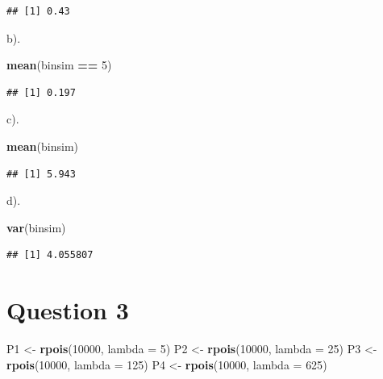 \documentclass[
]{article}
\newenvironment{Shaded}{\begin{snugshade}}{\end{snugshade}}
\newcommand{\AttributeTok}[1]{\textcolor[rgb]{0.13,0.29,0.53}{#1}}
\newcommand{\DecValTok}[1]{\textcolor[rgb]{0.00,0.00,0.81}{#1}}
\newcommand{\FunctionTok}[1]{\textcolor[rgb]{0.13,0.29,0.53}{\textbf{#1}}}
\newcommand{\NormalTok}[1]{#1}
\newcommand{\OtherTok}[1]{\textcolor[rgb]{0.56,0.35,0.01}{#1}}
\newcommand{\SpecialCharTok}[1]{\textcolor[rgb]{0.81,0.36,0.00}{\textbf{#1}}}
\begin{document}
\begin{verbatim}
## [1] 0.43
\end{verbatim}

b).

\begin{Shaded}
\begin{Highlighting}[]
\FunctionTok{mean}\NormalTok{(binsim }\SpecialCharTok{==} \DecValTok{5}\NormalTok{)}
\end{Highlighting}
\end{Shaded}

\begin{verbatim}
## [1] 0.197
\end{verbatim}

c).

\begin{Shaded}
\begin{Highlighting}[]
\FunctionTok{mean}\NormalTok{(binsim)}
\end{Highlighting}
\end{Shaded}

\begin{verbatim}
## [1] 5.943
\end{verbatim}

d).

\begin{Shaded}
\begin{Highlighting}[]
\FunctionTok{var}\NormalTok{(binsim)}
\end{Highlighting}
\end{Shaded}

\begin{verbatim}
## [1] 4.055807
\end{verbatim}

\section{Question 3}\label{question-3}

\begin{Shaded}
\begin{Highlighting}[]
\NormalTok{P1 }\OtherTok{\textless{}{-}} \FunctionTok{rpois}\NormalTok{(}\DecValTok{10000}\NormalTok{, }\AttributeTok{lambda =} \DecValTok{5}\NormalTok{)}
\NormalTok{P2 }\OtherTok{\textless{}{-}} \FunctionTok{rpois}\NormalTok{(}\DecValTok{10000}\NormalTok{, }\AttributeTok{lambda =} \DecValTok{25}\NormalTok{)}
\NormalTok{P3 }\OtherTok{\textless{}{-}} \FunctionTok{rpois}\NormalTok{(}\DecValTok{10000}\NormalTok{, }\AttributeTok{lambda =} \DecValTok{125}\NormalTok{)}
\NormalTok{P4 }\OtherTok{\textless{}{-}} \FunctionTok{rpois}\NormalTok{(}\DecValTok{10000}\NormalTok{, }\AttributeTok{lambda =} \DecValTok{625}\NormalTok{)}
\end{Highlighting}
\end{Shaded}
\end{document}
